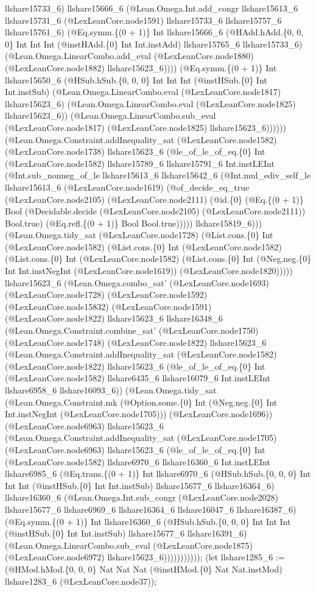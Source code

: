 \documentclass[11pt]{article}
\begin{document}
llshare15733\_6) llshare15666\_6 (@Lean.Omega.Int.add\_congr llshare15613\_6 llshare15731\_6 (@LexLeanCore.node1591) llshare15733\_6 llshare15757\_6 llshare15761\_6) (@Eq.symm.\{(0 + 1)\} Int llshare15666\_6 (@HAdd.hAdd.\{0, 0, 0\} Int Int Int (@instHAdd.\{0\} Int Int.instAdd) llshare15765\_6 llshare15733\_6) (@Lean.Omega.LinearCombo.add\_eval (@LexLeanCore.node1880) (@LexLeanCore.node1882) llshare15623\_6)))) (@Eq.symm.\{(0 + 1)\} Int llshare15650\_6 (@HSub.hSub.\{0, 0, 0\} Int Int Int (@instHSub.\{0\} Int Int.instSub) (@Lean.Omega.LinearCombo.eval (@LexLeanCore.node1817) llshare15623\_6) (@Lean.Omega.LinearCombo.eval (@LexLeanCore.node1825) llshare15623\_6)) (@Lean.Omega.LinearCombo.sub\_eval (@LexLeanCore.node1817) (@LexLeanCore.node1825) llshare15623\_6)))))) (@Lean.Omega.Constraint.addInequality\_sat (@LexLeanCore.node1582) (@LexLeanCore.node1738) llshare15623\_6 (@le\_of\_le\_of\_eq.\{0\} Int (@LexLeanCore.node1582) llshare15789\_6 llshare15791\_6 Int.instLEInt (@Int.sub\_nonneg\_of\_le llshare15613\_6 llshare15642\_6 (@Int.mul\_ediv\_self\_le llshare15613\_6 (@LexLeanCore.node1619) (@of\_decide\_eq\_true (@LexLeanCore.node2105) (@LexLeanCore.node2111) (@id.\{0\} (@Eq.\{(0 + 1)\} Bool (@Decidable.decide (@LexLeanCore.node2105) (@LexLeanCore.node2111)) Bool.true) (@Eq.refl.\{(0 + 1)\} Bool Bool.true))))) llshare15819\_6))) (@Lean.Omega.tidy\_sat (@LexLeanCore.node1728) (@List.cons.\{0\} Int (@LexLeanCore.node1582) (@List.cons.\{0\} Int (@LexLeanCore.node1582) (@List.cons.\{0\} Int (@LexLeanCore.node1582) (@List.cons.\{0\} Int (@Neg.neg.\{0\} Int Int.instNegInt (@LexLeanCore.node1619)) (@LexLeanCore.node1820))))) llshare15623\_6 (@Lean.Omega.combo\_sat' (@LexLeanCore.node1693) (@LexLeanCore.node1728) (@LexLeanCore.node1592) (@LexLeanCore.node15832) (@LexLeanCore.node1591) (@LexLeanCore.node1822) llshare15623\_6 llshare16348\_6 (@Lean.Omega.Constraint.combine\_sat' (@LexLeanCore.node1750) (@LexLeanCore.node1748) (@LexLeanCore.node1822) llshare15623\_6 (@Lean.Omega.Constraint.addInequality\_sat (@LexLeanCore.node1582) (@LexLeanCore.node1822) llshare15623\_6 (@le\_of\_le\_of\_eq.\{0\} Int (@LexLeanCore.node1582) llshare6435\_6 llshare16079\_6 Int.instLEInt llshare6958\_6 llshare16093\_6)) (@Lean.Omega.tidy\_sat (@Lean.Omega.Constraint.mk (@Option.some.\{0\} Int (@Neg.neg.\{0\} Int Int.instNegInt (@LexLeanCore.node1705))) (@LexLeanCore.node1696)) (@LexLeanCore.node6963) llshare15623\_6 (@Lean.Omega.Constraint.addInequality\_sat (@LexLeanCore.node1705) (@LexLeanCore.node6963) llshare15623\_6 (@le\_of\_le\_of\_eq.\{0\} Int (@LexLeanCore.node1582) llshare6970\_6 llshare16360\_6 Int.instLEInt llshare6985\_6 (@Eq.trans.\{(0 + 1)\} Int llshare6970\_6 (@HSub.hSub.\{0, 0, 0\} Int Int Int (@instHSub.\{0\} Int Int.instSub) llshare15677\_6 llshare16364\_6) llshare16360\_6 (@Lean.Omega.Int.sub\_congr (@LexLeanCore.node2028) llshare15677\_6 llshare6969\_6 llshare16364\_6 llshare16047\_6 llshare16387\_6) (@Eq.symm.\{(0 + 1)\} Int llshare16360\_6 (@HSub.hSub.\{0, 0, 0\} Int Int Int (@instHSub.\{0\} Int Int.instSub) llshare15677\_6 llshare16391\_6) (@Lean.Omega.LinearCombo.sub\_eval (@LexLeanCore.node1875) (@LexLeanCore.node6972) llshare15623\_6))))))))))); (let llshare1285\_6 := (@HMod.hMod.\{0, 0, 0\} Nat Nat Nat (@instHMod.\{0\} Nat Nat.instMod) llshare1283\_6 (@LexLeanCore.node37)); 
\end{document}
